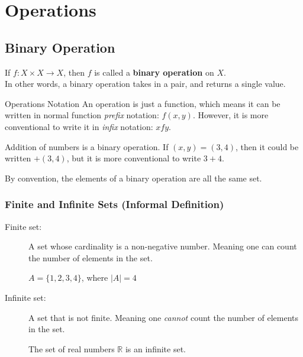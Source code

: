 \documentclass[../notes.tex]{subfiles}
\begin{document}
	\ifSubfilesClassLoaded{\setcounter{chapter}{7}}{}
	\chapter{Operations}
		\section{Binary Operation}
			If $f: X \times X \rightarrow X$, then $f$ is called a \textbf{binary operation} on $X$.\\
			In other words, a binary operation takes in a pair, and returns a single value.
			\begin{sidenote}{Operations Notation}
				An operation is just a function, which means it can be written in normal function \textit{prefix} notation: $f(x, y)$. However, it is more conventional to write it in \textit{infix} notation: $x f y$.
				\begin{example}
					Addition of numbers is a binary operation. If $(x, y) = (3, 4)$, then it could be written $+(3, 4)$, but it is more conventional to write $3 + 4$.
				\end{example}
			\end{sidenote}
			By convention, the elements of a binary operation are all the same set.
			\subsection[Finte and Infinite Sets]{Finite and Infinite Sets (Informal Definition)}
				\begin{description}
					\item[Finite set:] A set whose cardinality is a non-negative number. Meaning one can count the number of elements in the set.
						\begin{example}
							$A = \{1, 2, 3, 4\}$, where $\left\lvert A\right\rvert = 4$
						\end{example}
					\item[Infinite set:] A set that is not finite. Meaning one \textit{cannot} count the number of elements in the set.
						\begin{example}
							The set of real numbers $\mathbb{R}$ is an infinite set.
						\end{example}
				\end{description}
			\pagebreak
\end{document}
